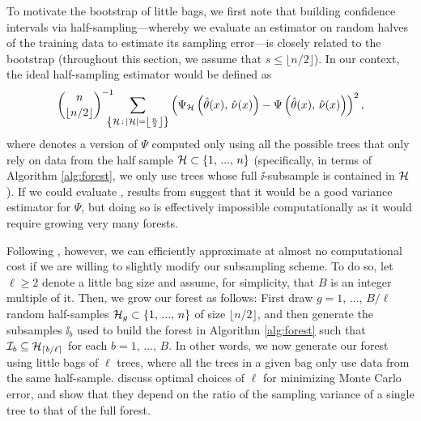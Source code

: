 \documentclass[aos]{imsart}
\theoremstyle{plain}
\theoremstyle{definition}
\theoremstyle{remark}
\begin{document}
\begin{CJK}{UTF8}{gbsn}
{To motivate the bootstrap of little bags, we first note that
building confidence intervals via half-sampling---whereby we evaluate an estimator on random
halves of the training data to estimate its sampling error---is closely related to the
bootstrap \citep{efron1982jackknife} (throughout this section, we assume that $s \leq \lfloor n/2 \rfloor$).
In our context, the ideal half-sampling estimator would be  defined as
\begin{equation}
\label{eq:hs_opt}
\binom{n}{\lfloor n/2 \rfloor}^{-1}
\!\!\!\!\!
\sum_{\cb{\hh \, : \, \abs{\hh} = \left\lfloor \frac{n}{2} \right\rfloor}}
\p{\Psi_{\hh}\p{\htheta(x), \, \hnu(x)} - \Psi\p{\htheta(x), \, \hnu(x)}}^2,
\end{equation}
where \smash{$\Psi_{\hh}$} denotes a version of $\Psi$ computed only using all the possible
trees that only rely on data from the half sample $\mathcal{H} \subset \left\{1, \, ..., \, n\right\}$ (specifically, in terms of Algorithm
\ref{alg:forest}, we only use trees whose full $\ii$-subsample is contained in $\mathcal{H}$).
If we could evaluate , results from \citet{efron1982jackknife}
suggest that it would be a good variance estimator for $\Psi$, but doing so is
effectively impossible computationally as it would require growing very many forests.

Following \citet{sexton2009standard}, however, we can efficiently approximate 
at almost no computational cost if we are willing to slightly modify our subsampling scheme.
To do so, let $\ell \geq 2$ denote a little bag size and assume, for simplicity, that $B$ is an integer
multiple of it.
Then, we grow our forest as follows: First draw $g = 1, \, ..., \, B/\ell$ random half-samples
$\mathcal{H}_g \subset \left\{1, \, ..., \, n\right\}$ of size $\lfloor n/2 \rfloor$, and then generate the subsamples
$\ii_b$ used to build the forest in Algorithm \ref{alg:forest} such that $\mathcal{I}_b \subseteq \mathcal{H}_{\lceil b/\ell \rceil}$
for each $b = 1, \, ..., \, B$. In other words, we now generate our forest using little bags of
$\ell$ trees, where all the trees in a given bag only use data from the same half-sample.
\citet{sexton2009standard} discuss optimal choices of $\ell$ for minimizing Monte Carlo error,
and show that they depend on the ratio of the sampling variance of a single tree to that of the full forest.

}
\end{CJK}
\end{document}
